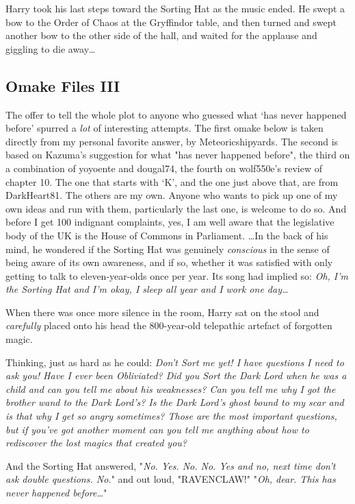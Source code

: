 Harry took his last steps toward the Sorting Hat as the music ended. He swept a 
bow to the Order of Chaos at the Gryffindor table, and then turned and swept 
another bow to the other side of the hall, and waited for the applause and 
giggling to die away{\ldots}
\sbreak
\vspace{-2\baselineskip}
\subsection{Omake Files III}
The offer to tell the whole plot to anyone who guessed what `has never happened 
before' spurred a \emph{lot} of interesting attempts. The first omake below is 
taken directly from my personal favorite answer, by Meteoricshipyards. The 
second is based on Kazuma's suggestion for what "has never happened before", 
the third on a combination of yoyoente and dougal74, the fourth on wolf550e's 
review of chapter 10. The one that starts with `K', and the one just above 
that, are from DarkHeart81. The others are my own. Anyone who wants to pick up 
one of my own ideas and run with them, particularly the last one, is welcome to 
do so. And before I get 100 indignant complaints, yes, I am well aware that the 
legislative body of the UK is the House of Commons in Parliament.
\sbreak
{\ldots}In the back of his mind, he wondered if the Sorting Hat was genuinely 
\emph{conscious} in the sense of being aware of its own awareness, and if so, 
whether it was satisfied with only getting to talk to eleven-year-olds once per 
year. Its song had implied so: \emph{Oh, I'm the Sorting Hat and I'm okay, I 
sleep all year and I work one day{\ldots}}

When there was once more silence in the room, Harry sat on the stool and 
\emph{carefully} placed onto his head the 800-year-old telepathic artefact of 
forgotten magic.

Thinking, just as hard as he could: \emph{Don't Sort me yet! I have questions I 
need to ask you! Have I ever been Obliviated? Did you Sort the Dark Lord when 
he was a child and can you tell me about his weaknesses? Can you tell me why I 
got the brother wand to the Dark Lord's? Is the Dark Lord's ghost bound to my 
scar and is that why I get so angry sometimes? Those are the most important 
questions, but if you've got another moment can you tell me anything about how 
to rediscover the lost magics that created you?}

And the Sorting Hat answered, "\emph{No. Yes. No. No. Yes and no, next time 
don't ask double questions. No.}" and out loud, "RAVENCLAW!"
\sbreak
"\emph{Oh, dear. This has never happened before{\ldots}}"

